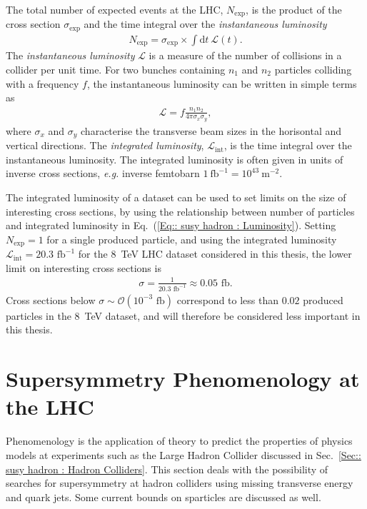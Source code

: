 \documentclass[twoside,english]{uiofysmaster}
\begin{document}
{The total number of expected events at the LHC, $N_{\mathrm{exp}}$, is the product of the cross section $\sigma_{\mathrm{exp}}$ and the time integral over the \textit{instantaneous luminosity}
\begin{align}\label{Eq:: susy hadron : Luminosity}
N_{\mathrm{exp}} = \sigma_{\mathrm{exp}} \times \int \mathrm{d}t~ \mathscr{L}(t).
\end{align}
The \textit{instantaneous luminosity} $\mathscr{L}$ is a measure of the number of collisions in a collider per unit time. For two bunches containing $n_1$ and $n_2$ particles colliding with a frequency $f$, the instantaneous luminosity can be written in simple terms as
\begin{align}
\mathscr{L} = f \frac{n_1 n_2}{4 \pi \sigma_x \sigma_y},
\end{align}
where $\sigma_x$ and $\sigma_y$ characterise the transverse beam sizes in the horisontal and vertical directions. The \textit{integrated luminosity}, $\mathscr{L}_{\mathrm{int}}$, is the time integral over the instantaneous luminosity. The integrated luminosity is often given in units of inverse cross sections, \textit{e.g.} inverse femtobarn $1~\mathrm{fb}^{-1} = 10^{43}~\mathrm{m}^{-2}$. 

The integrated luminosity of a dataset can be used to set limits on the size of interesting cross sections, by using the relationship between number of particles and integrated luminosity in Eq.~(\ref{Eq:: susy hadron : Luminosity}). Setting $N_{\mathrm{exp}}=1$ for a single produced particle, and using the integrated luminosity $\mathscr{L}_{\mathrm{int}} = 20.3 \text{ fb}^{-1}$ for the 8~TeV LHC dataset considered in this thesis, the lower limit on interesting cross sections is
\begin{align}
\sigma  = \frac{1}{20.3 \text{ fb}^{-1}} \approx 0.05 \text{ fb}.
\end{align}
Cross sections below $\sigma \sim \mathcal{O}(10^{-3} \text{ fb})$ correspond to less than $0.02$ produced particles in the 8~TeV dataset, and will therefore be considered less important in this thesis. 




\section{Supersymmetry Phenomenology at the LHC}

Phenomenology is the application of theory to predict the properties of physics models at experiments such as the Large Hadron Collider discussed in Sec.~\ref{Sec:: susy hadron : Hadron Colliders}. This section deals with the possibility of searches for supersymmetry at hadron colliders using missing transverse energy and quark jets. Some current bounds on sparticles are discussed as well.

}
\end{document}
